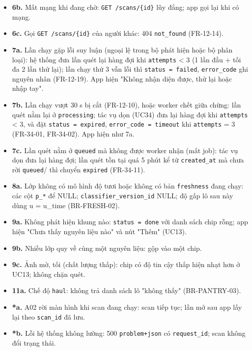 \begin{itemize}
\item \textbf{6b.} Mất mạng khi đang chờ: {\small\texttt{GET /\allowbreak{}\allowbreak{}scans/\allowbreak{}\allowbreak{}\{id\}}} lũy đẳng; app gọi lại khi có mạng.
\item \textbf{6c.} Gọi {\small\texttt{GET /\allowbreak{}\allowbreak{}scans/\allowbreak{}\allowbreak{}\{id\}}} của người khác: 404 {\small\texttt{not\_\allowbreak{}\allowbreak{}found}} (FR-\allowbreak{}12-\allowbreak{}14).
\item \textbf{7a.} Lần chạy gặp lỗi suy luận (ngoại lệ trong bộ phát hiện hoặc bộ phân loại): hệ thống đưa lần quét lại hàng đợi khi {\small\texttt{attempts}} < 3 (1 lần đầu + tối đa 2 lần thử lại); lần chạy thứ 3 vẫn lỗi thì {\small\texttt{status = failed}}, {\small\texttt{error\_\allowbreak{}\allowbreak{}code}} ghi nguyên nhân (FR-\allowbreak{}12-\allowbreak{}19). App hiện "Không nhận diện được, thử lại hoặc nhập tay".
\item \textbf{7b.} Lần chạy vượt 30 s bị cắt (FR-\allowbreak{}12-\allowbreak{}10), hoặc worker chết giữa chừng: lần quét nằm lại ở {\small\texttt{processing}}; tác vụ dọn (UC34) đưa lại hàng đợi khi {\small\texttt{attempts}} < 3, và đặt {\small\texttt{status = expired}}, {\small\texttt{error\_\allowbreak{}\allowbreak{}code = timeout}} khi {\small\texttt{attempts}} = 3 (FR-\allowbreak{}34-\allowbreak{}01, FR-\allowbreak{}34-\allowbreak{}02). App hiện như 7a.
\item \textbf{7c.} Lần quét nằm ở {\small\texttt{queued}} mà không được worker nhận (mất job): tác vụ dọn đưa lại hàng đợi; lần quét tồn tại quá 5 phút kể từ {\small\texttt{created\_\allowbreak{}\allowbreak{}at}} mà chưa rời {\small\texttt{queued}}/ thì chuyển {\small\texttt{expired}} (FR-\allowbreak{}34-\allowbreak{}11).
\item \textbf{8a.} Lớp không có mô hình độ tươi hoặc không có bản {\small\texttt{freshness}} đang chạy: các cột {\small\texttt{p\_\allowbreak{}\allowbreak{}*}} để NULL; {\small\texttt{classifier\_\allowbreak{}\allowbreak{}version\_\allowbreak{}\allowbreak{}id}} NULL; độ gấp lô sau này dùng u = u\_\allowbreak{}time (BR-\allowbreak{}FRESH-\allowbreak{}02).
\item \textbf{9a.} Không phát hiện khung nào: {\small\texttt{status = done}} với danh sách chip rỗng; app hiện "Chưa thấy nguyên liệu nào" và nút "Thêm" (UC13).
\item \textbf{9b.} Nhiều lớp quy về cùng một nguyên liệu: gộp vào một chip.
\item \textbf{9c.} Ảnh mờ, tối (chất lượng thấp): chip có độ tin cậy thấp hiện nhạt hơn ở UC13; không chặn quét.
\item \textbf{11a.} Chế độ {\small\texttt{haul}}: không trả danh sách lô "không thấy" (BR-\allowbreak{}PANTRY-\allowbreak{}03).
\item \textbf{*a.} A02 rời màn hình khi scan đang chạy: scan tiếp tục; lần mở sau app lấy lại theo {\small\texttt{scan\_\allowbreak{}\allowbreak{}id}} đã lưu.
\item \textbf{*b.} Lỗi hệ thống không lường: 500 {\small\texttt{problem+json}} có {\small\texttt{request\_\allowbreak{}\allowbreak{}id}}; scan không đổi trạng thái.
\end{itemize}
